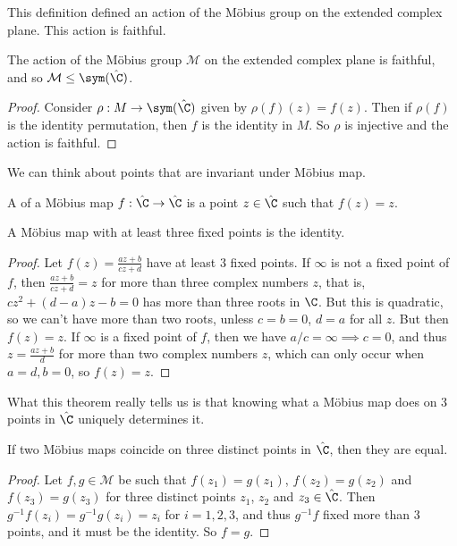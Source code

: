 This definition defined an action of the Möbius group on the extended complex plane. This action is faithful.

\begin{proposition}
	The action of the Möbius group $\mathcal{M}$ on the extended complex plane is faithful, and so $\mathcal{M} \leq \sym(\hat{\C})$.
\end{proposition}
\begin{proof}
	Consider $\rho : M \rightarrow \sym(\hat{\C})$ given by $\rho(f)(z) = f(z)$. Then if $\rho(f)$ is the identity permutation, then $f$ is the identity in $M$. So $\rho$ is injective and the action is faithful.
\end{proof}

We can think about points that are invariant under Möbius map.

\begin{definition}
	A  of a Möbius map $f: \hat{\C} 	\rightarrow \hat{\C}$ is a point $z \in \hat{\C}$ such that $f(z) = z$.
\end{definition}

\begin{theorem}
	A Möbius map with at least three fixed points is the identity.
\end{theorem}
\begin{proof}
Let $f(z) = \frac{az + b}{cz + d}$ have at least 3 fixed points. If $\infty$ is not a fixed point of $f$, then $\frac{az + b}{cz + d} = z$ for more than three complex numbers $z$, that is, $cz^2 + (d - a)z - b = 0$ has more than three roots in $\C$. But this is quadratic, so we can't have more than two roots, unless $c = b = 0$, $d = a$ for all $z$. But then $f(z) = z$. If $\infty$ is a fixed point of $f$, then we have $a/c = \infty \implies c = 0$, and thus $z = \frac{az + b}{d}$ for more than two complex numbers $z$, which can only occur when $a = d, b = 0$, so $f(z) = z$.
\end{proof}

What this theorem really tells us is that knowing what a Möbius map does on 3 points in $\hat{\C}$ uniquely determines it.

\begin{corollary}
	If two Möbius maps coincide on three distinct points in $\hat{\C}$, then they are equal.
\end{corollary}
\begin{proof}
	Let $f, g \in \mathcal{M}$ be such that $f(z_1) = g(z_1)$, $f(z_2) = g(z_2)$ and $f(z_3) = g(z_3)$ for three distinct points $z_1$, $z_2$ and $z_3 \in \hat{\C}$. Then $g^{-1}f(z_i) = g^{-1} g(z_i) = z_i$ for $i = 1, 2, 3$, and thus $g^{-1}f$ fixed more than 3 points, and it must be the identity. So $f = g$.
\end{proof}


